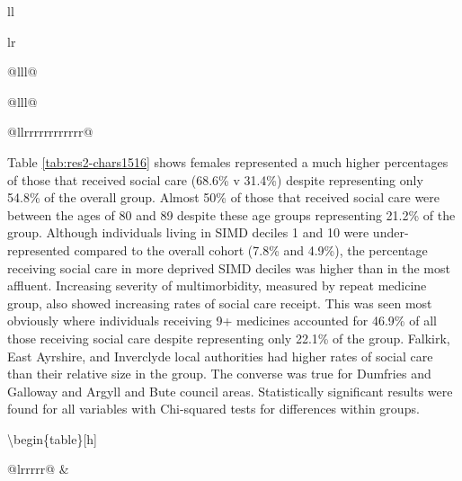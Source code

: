 \documentclass[12pt,a4paper,oneside,table]{report}
\begin{document}
\begin{tabular}[t]{ll}
\begin{tabular}{lr}
{\begin{tabular}{@{}lll@{}}
\begin{tabular}{@{}lll@{}}
\begin{tabular}{@{}llrrrrrrrrrrrr@{}}
{Table \ref{tab:res2-chars1516} shows females represented a much higher
percentages of those that received social care (68.6\% v 31.4\%) despite
representing only 54.8\% of the overall group. Almost 50\% of those that
received social care were between the ages of 80 and 89 despite these
age groups representing 21.2\% of the group. Although individuals living
in SIMD deciles 1 and 10 were under-represented compared to the overall
cohort (7.8\% and 4.9\%), the percentage receiving social care in more
deprived SIMD deciles was higher than in the most affluent. Increasing
severity of multimorbidity, measured by repeat medicine group, also
showed increasing rates of social care receipt. This was seen most
obviously where individuals receiving 9+ medicines accounted for 46.9\%
of all those receiving social care despite representing only 22.1\% of
the group. Falkirk, East Ayrshire, and Inverclyde local authorities had
higher rates of social care than their relative size in the group. The
converse was true for Dumfries and Galloway and Argyll and Bute council
areas. Statistically significant results were found for all variables
with Chi-squared tests for differences within groups.

\textbackslash begin\{table\}{[}h{]} \footnotesize \centering

\begin{tabular}{@{}lrrrrr@{}}
\toprule
 & 
\end{tabular}}
\end{tabular}
\end{tabular}
\end{tabular}}
\end{tabular}
\end{tabular}
\end{document}

